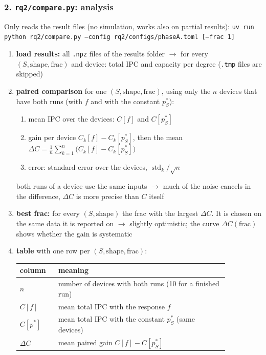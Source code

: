 \subsubsection*{2. \texttt{rq2/compare.py}: analysis}
Only reads the result files (no simulation, works also on partial results):
\texttt{uv run python rq2/compare.py --config rq2/configs/phaseA.toml [--frac 1]}
\begin{enumerate}
    \item \textbf{load results:} all \texttt{.npz} files of the results folder $\to$ for every
    $(S, \text{shape}, \text{frac})$ and device: total IPC and capacity per degree (\texttt{.tmp} files are skipped)
    \item \textbf{paired comparison} for one $(S, \text{shape}, \text{frac})$, using only the $n$ devices that have
    both runs (with $f$ and with the constant $p^*_S$):
    \begin{enumerate}
        \item[i)] mean IPC over the devices: $C[f]$ and $C[p^*_S]$
        \item[ii)] gain per device $C_k[f] - C_k[p^*_S]$, then the mean
        $\Delta C = \frac{1}{n} \sum_{k=1}^{n} \big(C_k[f] - C_k[p^*_S]\big)$
        \item[iii)] error: standard error over the devices, $\operatorname{std}_k / \sqrt{n}$
    \end{enumerate}
    both runs of a device use the same inputs $\to$ much of the noise cancels in the difference, $\Delta C$ is more
    precise than $C$ itself
    \item \textbf{best frac:} for every $(S, \text{shape})$ the frac with the largest $\Delta C$. It is chosen on
    the same data it is reported on $\to$ slightly optimistic; the curve $\Delta C(\text{frac})$ shows whether the
    gain is systematic
    \item \textbf{table} with one row per $(S, \text{shape}, \text{frac})$:
    \begin{center}
    \begin{tabular}{p{0.15\linewidth}p{0.7\linewidth}}
        \hline
        column & meaning \\
        \hline
        $n$ & number of devices with both runs (10 for a finished run) \\
        $C[f]$ & mean total IPC with the response $f$ \\
        $C[p^*]$ & mean total IPC with the constant $p^*_S$ (same devices) \\
        $\Delta C$ & mean paired gain $C[f] - C[p^*_S]$ \\

\end{tabular}
\end{center}
\end{enumerate}
